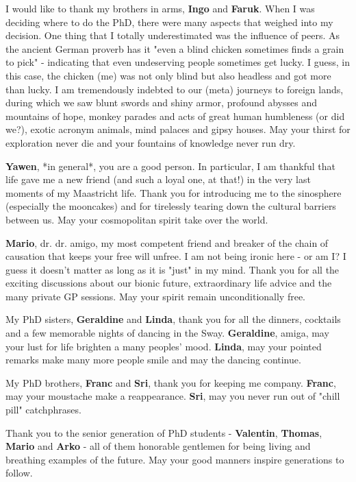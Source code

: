 I would like to thank my brothers in arms, \textbf{Ingo} and \textbf{Faruk}. When I was deciding where to do the PhD, there were many aspects that weighed into my decision. One thing that I totally underestimated was the influence of peers. As the ancient German proverb has it "even a blind chicken sometimes finds a grain to pick" - indicating that even undeserving people sometimes get lucky. I guess, in this case, the chicken (me) was not only blind but also headless and got more than lucky. I am tremendously indebted to our (meta) journeys to foreign lands, during which we saw blunt swords and shiny armor, profound abysses and mountains of hope, monkey parades and acts of great human humbleness (or did we?), exotic acronym animals, mind palaces and gipsy houses. May your thirst for exploration never die and your fountains of knowledge never run dry.

\textbf{Yawen}, *in general*, you are a good person. In particular, I am thankful that life gave me a new friend (and such a loyal one, at that!) in the very last moments of my Maastricht life. Thank you for introducing me to the sinosphere (especially the mooncakes) and for tirelessly tearing down the cultural barriers between us. May your cosmopolitan spirit take over the world.

\textbf{Mario}, dr. dr. amigo, my most competent friend and breaker of the chain of causation that keeps your free will unfree. I am not being ironic here - or am I? I guess it doesn't matter as long as it is "just" in my mind. Thank you for all the exciting discussions about our bionic future, extraordinary life advice and the many private GP sessions. May your spirit remain unconditionally free.

My PhD sisters, \textbf{Geraldine} and \textbf{Linda}, thank you for all the dinners, cocktails and a few memorable nights of dancing in the Sway. \textbf{Geraldine}, amiga, may your lust for life brighten a many peoples' mood. \textbf{Linda}, may your pointed remarks make many more people smile and may the dancing continue.

My PhD brothers, \textbf{Franc} and \textbf{Sri}, thank you for keeping me company. \textbf{Franc}, may your moustache make a reappearance. \textbf{Sri}, may you never run out of "chill pill" catchphrases.

Thank you to the senior generation of PhD students - \textbf{Valentin}, \textbf{Thomas}, \textbf{Mario} and \textbf{Arko} - all of them honorable gentlemen for being living and breathing examples of the future. May your good manners inspire generations to follow.

